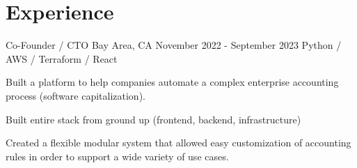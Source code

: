 \documentclass[letterpaper]{simjega-resume}
\begin{document}






%
%

\section{Experience}
\jgsectionline

{Co-Founder / CTO}
{Bay Area, CA}
{November 2022 - September 2023}
{Python / AWS / Terraform / React}
{\begin{tightitemize}
\item[] Built a platform to help companies automate a complex enterprise accounting process (software capitalization).
\item[] Built entire stack from ground up (frontend, backend, infrastructure)
\item[] Created a flexible modular system that allowed easy customization of accounting rules in order to support a wide variety of use cases.
\end{tightitemize}}
\end{document}
